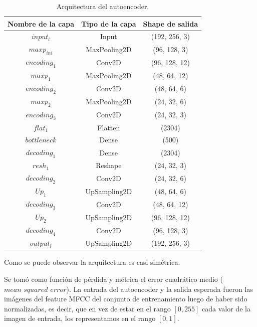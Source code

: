 \documentclass[colorinlistoftodos,twoside,twocolumn,10pt]{article} %
\begin{document}
\begin{table}
	\begin{center}
		\begin{tabular}{ | c | c | c |}
			\hline
			\textbf{Nombre de la capa} & \textbf{Tipo de la capa} & \textbf{Shape de salida} \\ \hline
			$input_l$ & Input & (192, 256, 3) \\ \hline
			$maxp_{ini}$ & MaxPooling2D & (96, 128, 3) \\ \hline
			$encoding_1$ & Conv2D & (96, 128, 12) \\ \hline
			$maxp_1$ & MaxPooling2D & (48, 64, 12) \\ \hline
			$encoding_2$ & Conv2D & (48, 64, 6) \\ \hline
			$maxp_2$ & MaxPooling2D & (24, 32, 6) \\ \hline
			$encoding_3$ & Conv2D & (24, 32, 3) \\ \hline
			$flat_1$ & Flatten & (2304) \\ \hline
			$bottleneck$ & Dense & (500) \\ \hline
			$decoding_1$ & Dense & (2304) \\ \hline
			$resh_1$ & Reshape & (24, 32, 3) \\ \hline
			$decoding_2$ & Conv2D & (24, 32, 6) \\ \hline
			$Up_1$ & UpSampling2D & (48, 64, 6) \\ \hline
			$decoding_3$ & Conv2D & (48, 64, 12) \\ \hline
			$Up_2$ & UpSampling2D & (96, 128, 12) \\ \hline
			$decoding_4$ & Conv2D & (96, 128, 3) \\ \hline
			$output_l$ & UpSampling2D & (192, 256, 3) \\
			\hline
		\end{tabular}
		\caption{Arquitectura del autoencoder.}
		\label{tabla:2}
	\end{center}
\end{table}

Como se puede observar la arquitectura es casi simétrica.

Se tomó como función de pérdida y métrica el error cuadrático medio ($\textit{mean squared error}$). La entrada del autoencoder y la salida esperada fueron las imágenes del feature MFCC del conjunto de entrenamiento luego de haber sido normalizadas, es decir, que en vez de estar en el rango $[0, 255]$ cada valor de la imagen de entrada, los representamos en el rango $[0, 1]$. 
\end{document}
